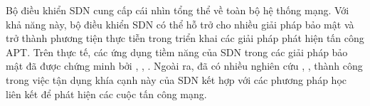 Bộ điều khiển SDN cung cấp cái nhìn tổng thể về toàn bộ hệ thống mạng. Với khả năng này, bộ điều khiển SDN có thể hỗ trở cho nhiều giải pháp bảo mật và trở thành phương tiện thực tiễn trong triển khai các giải pháp phát hiện tấn công APT. Trên thực tế, các ứng dụng tiềm năng của SDN trong các giải pháp bảo mật đã được chứng minh bởi \cite{farris2018survey}, \cite{yurekten2021sdn}, \cite{zarca2020virtual}. Ngoài ra, đã có nhiều nghiên cứu \cite{abdel2021federated}, \cite{thi2022federated}, \cite{mothukuri2021federated} thành công trong việc tận dụng khía cạnh này của SDN kết hợp với các phương pháp học liên kết để phát hiện các cuộc tấn công mạng.
